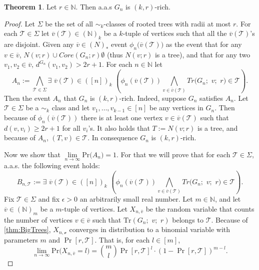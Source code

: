 \documentclass[12pt,notitlepage,a4paper]{article}
\theoremstyle{definition}
\newtheorem{theorem}{Theorem}[section]
\newcommand{\N}{\mathbb{N}}
\newcommand{\Ln}{\lim\limits_{n\to \infty}}
\newcommand{\PR}[1]{\mathrm{Pr}\big(#1\big)}
\begin{document}
	\begin{theorem}\label{thm:rich}
		Let $r\in \N$. Then a.a.s $G_n$ is $(k,r)$-rich.
	\end{theorem}
	\begin{proof}
		Let $\Sigma$ be the set of all $\sim_k$-classes of rooted trees
		with radii at most $r$. For each $\mathcal{T}\in \Sigma$
		let $\overline{v}(\mathcal{T})\in (\N)_k$ be a $k$-tuple of 
		vertices such that all the $\overline{v}(\mathcal{T})$'s are
		disjoint. Given any $\overline{v}\in (N)_*$
		event $\phi_n\big(\overline{v}(\mathcal{T})\big)$ as the event that
		for any $v\in \overline{v}$, $N(v;r)\cup Core(G_n;r)\emptyset$ 
		(thus $N(v;r)$ is a tree),
		and that for any two $v_1,v_2\in \overline{v}$, 
		$d^{G_n}(v_1,v_2)>2r+1$. For each $n\in \N$ let
		\[
		A_n:=\bigwedge_{\mathcal{T}\in \Sigma} 
		\exists\,\, \overline{v}(\mathcal{T}) \in ([n])_k\,\,
		 \left(
		\phi_n(\overline{v}(\mathcal{T})) \bigwedge_{
		v\in \overline{v}(\mathcal{T})} 
		Tr\big(
		G_n;\,\,v;\,\,r
		\big)\in \mathcal{T}
		\right).
		\]
		Then the event $A_n$ that $G_n$ is $(k,r)$-rich.
		Indeed, suppose $G_n$ satisfies
		$A_n$. Let $\mathcal{T}\in \Sigma$ be a $\sim_k$ class and let 
		$v_1,\dots,v_{k-1}\in [n]$ be any vertices in $G_n$. Then because of
		$\phi_n(\overline{v}(\mathcal{T}))$ there is at least
		one vertex $v\in \overline{v}(\mathcal{T})$ such that $d(v,v_i)\geq 2r+1$
		for all $v_i$'s. It also holds that $T:=N(v;r)$ is a tree, and because of
		$A_n$, $(T,v)\in \mathcal{T}$. In consequence $G_n$ is $(k,r)$-rich.\par
		Now we show that $\Ln \PR{A_n}=1$. For that we will prove that for
		each $\mathcal{T}\in \Sigma$, a.a.s. the following event holds:
		\[
		B_{n,\mathcal{T}}:=
		\exists\,\, \overline{v}(\mathcal{T}) \in ([n])_k\,\,
		\left(
		\phi_n(\overline{v}(\mathcal{T})) \bigwedge_{
			v\in \overline{v}(\mathcal{T})} 
		Tr\big(
		G_n;\,\,v;\,\,r
		\big)\in \mathcal{T}
		\right).
		\]
		Fix $\mathcal{T}\in \Sigma$ and fix $\epsilon>0$ an arbitrarily 
		small real number. Let $m\in \N$,
		and let $\overline{v}\in (\N)_m$ be a $m$-tuple of vertices. Let 
		$X_{n,\overline{v}}$ be the random variable that counts the number of 
		vertices $v\in \overline{v}$ such that $\mathrm{Tr}(G_n;\,\,v;\,\,r)$
		belongs to $\mathcal{T}$. Because of \cref{thm:BigTrees}, $X_{n,\mathcal{v}}$
		converges in distribution to a binomial variable with parameters $m$ and
		$\Pr[r, \mathcal{T}]$. That is, for each $l\in [m]$,
		\[
		\Ln \PR{X_{n,\overline{v}}=l}= \binom{m}{l} \Pr[r, \mathcal{T}]^l \cdot \left(
		1-\Pr[r,\mathcal{T}]\right)^{m-l}.
\]
\end{proof}
\end{document}
